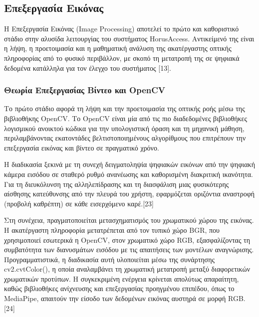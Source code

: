 \documentclass[twoside, a4paper, 11pt]{article}
\newcommand{\textlatin}[1]{\textenglish{#1}}
\begin{document}
\subsection{Επεξεργασία Εικόνας}
Η Επεξεργασία Εικόνας (\textlatin{Image Processing}) αποτελεί το πρώτο και καθοριστικό στάδιο στην αλυσίδα λειτουργίας του συστήματος \textlatin{HorusAccess}. Αντικείμενό της είναι η λήψη, η προετοιμασία και η μαθηματική ανάλυση της ακατέργαστης οπτικής πληροφορίας από το φυσικό περιβάλλον, με σκοπό τη μετατροπή της σε ψηφιακά δεδομένα κατάλληλα για τον έλεγχο του συστήματος [13].

\subsubsection{Θεωρία Επεξεργασίας Βίντεο και OpenCV}

Το πρώτο στάδιο αφορά τη λήψη και την προετοιμασία της οπτικής ροής μέσω της βιβλιοθήκης OpenCV.
Το OpenCV είναι μία από τις πιο διαδεδομένες βιβλιοθήκες λογισμικού ανοικτού κώδικα για την υπολογιστική όραση και
τη μηχανική μάθηση, περιλαμβάνοντας εκατοντάδες βελτιστοποιημένους αλγορίθμους που επιτρέπουν την επεξεργασία εικόνας και βίντεο σε πραγματικό χρόνο.

Η διαδικασία ξεκινά με τη συνεχή δειγματοληψία ψηφιακών εικόνων από την ψηφιακή κάμερα εισόδου σε σταθερό ρυθμό ανανέωσης και 
καθορισμένη διακριτική ικανότητα. Για τη διευκόλυνση της αλληλεπίδρασης και τη διασφάλιση μιας φυσικότερης αίσθησης κατεύθυνσης 
από την πλευρά του χρήστη, εφαρμόζεται οριζόντια αναστροφή (προβολή καθρέπτη) σε κάθε εισερχόμενο καρέ.[23]

Στη συνέχεια, πραγματοποιείται μετασχηματισμός του χρωματικού χώρου της εικόνας.
Η ακατέργαστη πληροφορία μετατρέπεται από τον τυπικό χώρο BGR, που χρησιμοποιεί εσωτερικά η OpenCV, στον χρωματικό χώρο RGB, εξασφαλίζοντας
τη συμβατότητα των διανυσμάτων εισόδου με τις απαιτήσεις των μοντέλων αναγνώρισης.
Προγραμματιστικά, η διαδικασία αυτή υλοποιείται μέσω της συνάρτησης cv2.cvtColor(), η οποία αναλαμβάνει τη χρωματική μετατροπή μεταξύ διαφορετικών χρωματικών προτύπων.
Η συγκεκριμένη ενέργεια κρίνεται απολύτως απαραίτητη, καθώς βιβλιοθήκες ανίχνευσης και επεξεργασίας προηγμένου επιπέδου, όπως το MediaPipe, απαιτούν την είσοδο των δεδομένων εικόνας αυστηρά σε μορφή RGB.[24]
\end{document}
